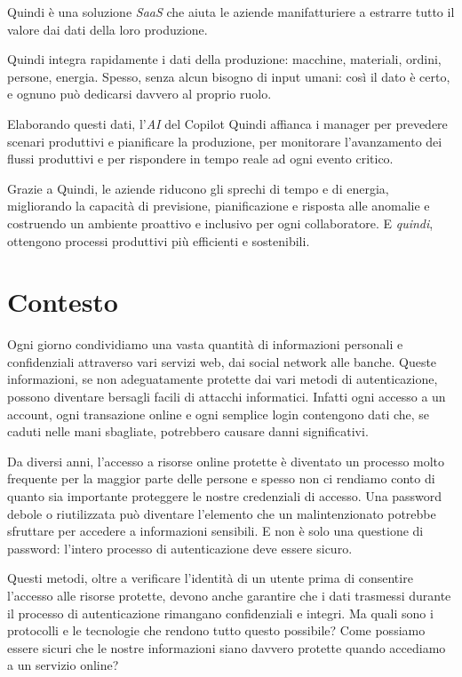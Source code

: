 Quindi è una soluzione \emph{\gls{SaaS}} che aiuta le aziende manifatturiere a estrarre tutto il valore dai dati della loro produzione.

Quindi integra rapidamente i dati della produzione: macchine, materiali, ordini, persone, energia. Spesso, senza alcun bisogno di input umani: così il dato è certo, e ognuno può dedicarsi davvero al proprio ruolo.

Elaborando questi dati, l'\emph{\gls{AI}} del Copilot Quindi affianca i manager per prevedere scenari produttivi e pianificare la produzione, per monitorare l’avanzamento dei flussi produttivi e per rispondere in tempo reale ad ogni evento critico.

Grazie a Quindi, le aziende riducono gli sprechi di tempo e di energia, migliorando la capacità di previsione, pianificazione e risposta alle anomalie e costruendo un ambiente proattivo e inclusivo per ogni collaboratore. E \emph{quindi}, ottengono processi produttivi più efficienti e sostenibili.


\section{Contesto}

Ogni giorno condividiamo una vasta quantità di informazioni personali e confidenziali attraverso vari servizi web, dai social network alle banche.
Queste informazioni, se non adeguatamente protette dai vari metodi di autenticazione, possono diventare bersagli facili di attacchi informatici.
Infatti ogni accesso a un account, ogni transazione online e ogni semplice login contengono dati che, se caduti nelle mani sbagliate, potrebbero causare danni significativi.

Da diversi anni, l'accesso a risorse online protette è diventato un processo molto frequente per la maggior parte delle persone e spesso non ci rendiamo conto di quanto sia importante proteggere le nostre credenziali di accesso.
Una password debole o riutilizzata può diventare l'elemento che un malintenzionato potrebbe sfruttare per accedere a informazioni sensibili.
E non è solo una questione di password: l'intero processo di autenticazione deve essere sicuro.

Questi metodi, oltre a verificare l'identità di un utente prima di consentire l'accesso alle risorse protette, devono anche garantire che i dati trasmessi durante il processo di autenticazione rimangano confidenziali e integri.
Ma quali sono i protocolli e le tecnologie che rendono tutto questo possibile? Come possiamo essere sicuri che le nostre informazioni siano davvero protette quando accediamo a un servizio online?

